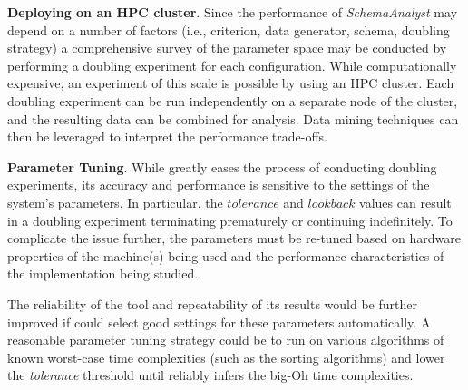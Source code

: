 
{\bf Deploying on an HPC cluster}.
Since the performance of \textit{SchemaAnalyst} may depend on a number
of factors (i.e., criterion, data generator, schema, doubling strategy) a
comprehensive survey of the parameter space may be conducted by
performing a doubling experiment for each configuration. While
computationally expensive, an experiment of this scale is possible by
using an HPC cluster. Each doubling experiment can be run independently
on a separate node of the cluster, and the resulting data can be combined
for analysis. Data mining techniques can then be leveraged to interpret
the performance trade-offs.


 {\bf Parameter Tuning}.  While \toolname greatly eases the process of
 conducting doubling experiments, its accuracy and performance is sensitive to
 the settings of the system's parameters.  In particular, the
 $\mathit{tolerance}$ and $\mathit{lookback}$ values can result in a doubling
 experiment terminating prematurely or continuing indefinitely.  To complicate
 the issue further, the parameters must be re-tuned based on hardware
 properties of the machine(s) being used and the performance characteristics of
 the implementation being studied.

  The reliability of the tool and repeatability of its results would be further
  improved if \toolname could select good settings for these parameters
  automatically. A reasonable parameter tuning strategy could be to run
  \toolname on various algorithms of known worst-case time complexities (such
  as the sorting algorithms) and lower the \textit{tolerance} threshold until
  \toolname reliably infers the big-Oh time complexities.

